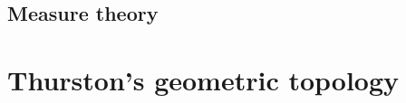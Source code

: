 \documentclass[reqno,11pt]{amsart}
\newcommand{\CC}{\mathbf{C}}
\newcommand{\Hyp}{\mathbf H}
\DeclareMathOperator{\dist}{dist}
\newcommand{\Leaves}{\mathscr L}
\newcommand{\Hypspace}{\mathscr H}
\newtheorem{proposition}[theorem]{Proposition}
\theoremstyle{definition}
\newtheorem{definition}[theorem]{Definition}
\newtheorem{example}[theorem]{Example}
\numberwithin{equation}{section}
\begin{document}
\subsection{Measure theory}\label{MeasurePrelims}

\section{Thurston's geometric topology}
%
%
%
%
%
%
%
\end{document}
